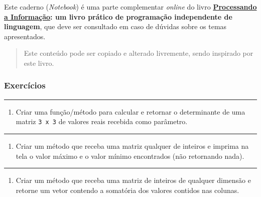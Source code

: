 \documentclass[12pt,a4paper]{article}
\renewcommand{\linethickness}{0.05em}
\providecommand{\tightlist}{%
      \setlength{\itemsep}{0pt}\setlength{\parskip}{0pt}}
\begin{document}
Este caderno (\emph{Notebook}) é uma parte complementar \emph{online} do
livro
\textbf{\href{https://editora.ufabc.edu.br/matematica-e-ciencias-da-computacao/58-processando-a-informacao}{Processando
a Informação}: um livro prático de programação independente de
linguagem}, que deve ser consultado em caso de dúvidas sobre os temas
apresentados.

\begin{quote}
Este conteúdo pode ser copiado e alterado livremente, sendo inspirado
por este livro.
\end{quote}

    \hypertarget{exercuxedcios}{%
\subsubsection{Exercícios}\label{exercuxedcios}}

    \begin{center}\rule{0.5\linewidth}{\linethickness}\end{center}

\begin{enumerate}
\def\labelenumi{\arabic{enumi}.}
\tightlist
\item
  Criar uma função/método para calcular e retornar o determinante de uma
  matriz \texttt{3\ x\ 3} de valores reais recebida como parâmetro.
\end{enumerate}

    \begin{center}\rule{0.5\linewidth}{\linethickness}\end{center}

\begin{enumerate}
\def\labelenumi{\arabic{enumi}.}
\setcounter{enumi}{1}
\tightlist
\item
  Criar um método que receba uma matriz qualquer de inteiros e imprima
  na tela o valor máximo e o valor mínimo encontrados (não retornando
  nada).
\end{enumerate}

    \begin{center}\rule{0.5\linewidth}{\linethickness}\end{center}

\begin{enumerate}
\def\labelenumi{\arabic{enumi}.}
\setcounter{enumi}{2}
\tightlist
\item
  Criar um método que receba uma matriz de inteiros de qualquer dimensão
  e retorne um vetor contendo a somatória dos valores contidos nas
  colunas.
\end{enumerate}
\end{document}
